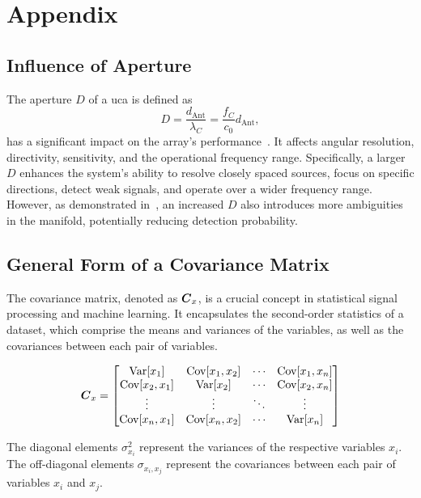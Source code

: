 
\appendix
\chapter{Appendix}

\section{Influence of Aperture}
\label{app:sec:ApertureInfluence}

The aperture \( D \) of a \gls{uca} is defined as
\[
    D = \frac{d_{\text{Ant}}}{\lambda_C} = \frac{f_C}{c_0} d_{\text{Ant}},
\]
has a significant impact on the array's performance~\cite{meyer,tuncer.ch2,tuncer.ch6}. It affects angular resolution,
directivity, sensitivity, and the operational frequency range. Specifically, a larger \( D \) enhances the system's
ability to resolve closely spaced sources, focus on specific directions, detect weak signals, and operate over a wider
frequency range. However, as demonstrated in~\cite[Chapter 8.3]{meyer}, an increased \( D \) also introduces more ambiguities
in the manifold, potentially reducing detection probability.

\section{General Form of a Covariance Matrix}
\label{app:sec:GeneralCovMatrix}
The covariance matrix, denoted as \( \boldsymbol{C}_x \), is a crucial concept in statistical signal processing and machine
learning. It encapsulates the second-order statistics of a dataset, which comprise the means and variances of the
variables, as well as the covariances between each pair of variables.

\[
    \boldsymbol{C}_x =
    \begin{bmatrix}
        \operatorname{Var}[x_1]    & \operatorname{Cov}[x_1, x_2] & \cdots & \operatorname{Cov}[x_1, x_n] \\
        \operatorname{Cov}[x_2, x_1] & \operatorname{Var}[x_2]    & \cdots & \operatorname{Cov}[x_2, x_n] \\
        \vdots            & \vdots            & \ddots & \vdots            \\
        \operatorname{Cov}[x_n, x_1] & \operatorname{Cov}[x_n, x_2] & \cdots & \operatorname{Var}[x_n]
    \end{bmatrix}
\]

The diagonal elements \( \sigma^2_{x_i} \) represent the variances of the respective variables \( x_i \).
The off-diagonal elements \( \sigma_{x_i, x_j} \) represent the covariances between each pair of variables
\( x_i \) and \( x_j \).

